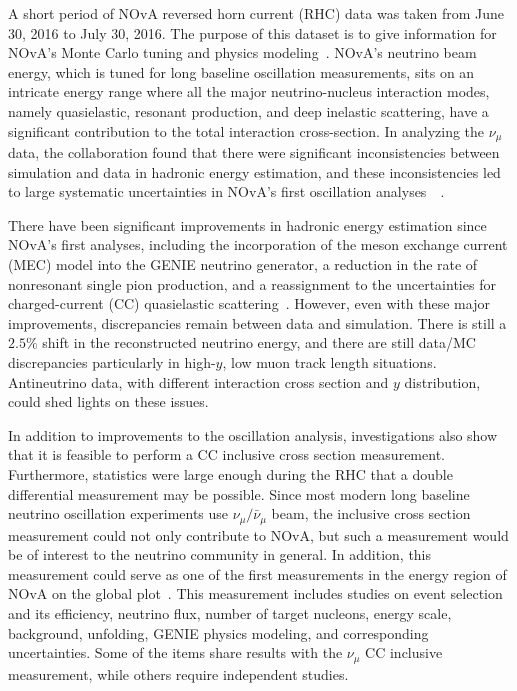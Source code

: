 \documentclass[a4paper, 11pt]{article} %
\begin{document}
A short period of NOvA reversed horn current (RHC) data was taken from June 30, 2016 to July 30, 2016. The purpose of this dataset is to give information for NOvA's Monte Carlo tuning and physics modeling~\cite{Patterson:2016_1}. NOvA's neutrino beam energy, which is tuned for long baseline oscillation measurements, sits on an intricate energy range where all the major neutrino-nucleus interaction modes, namely quasielastic, resonant production, and deep inelastic scattering, have a significant contribution to the total interaction cross-section. In analyzing the $\nu_\mu$ data, the collaboration found that there were significant inconsistencies between simulation and data in hadronic energy estimation, and these inconsistencies led to large systematic uncertainties in NOvA's first oscillation analyses~\cite{NOvA:2016_1}~\cite{NOvA:2016_2}.

There have been significant improvements in hadronic energy estimation since NOvA's first analyses, including the incorporation of the meson exchange current (MEC) model into the GENIE neutrino generator, a reduction in the rate of nonresonant single pion production, and a reassignment to the uncertainties for charged-current (CC) quasielastic scattering~\cite{Wolcott:2016_1}. However, even with these major improvements, discrepancies remain between data and simulation. There is still a $2.5\%$ shift in the reconstructed neutrino energy, and there are still data/MC discrepancies particularly in  high-$y$, low muon track length situations. Antineutrino data, with different interaction cross section and $y$ distribution, could shed lights on these issues.

In addition to improvements to the oscillation analysis, investigations also show that it is feasible to perform a CC inclusive cross section measurement. Furthermore, statistics were large enough during the RHC that a double differential measurement may be possible. Since most modern long baseline neutrino oscillation experiments use $\nu_\mu/\bar{\nu}_\mu$ beam, the inclusive cross section measurement could not only contribute to NOvA, but such a measurement would be of interest to the neutrino community in general. In addition, this measurement could serve as one of the first measurements in the energy region of NOvA on the global plot~\cite{Zeller:2015_1}. This measurement includes studies on event selection and its efficiency, neutrino flux, number of target nucleons, energy scale, background, unfolding, GENIE physics modeling, and corresponding uncertainties. Some of the items share results with the $\nu_\mu$ CC inclusive measurement, while others require independent studies.
\end{document}
